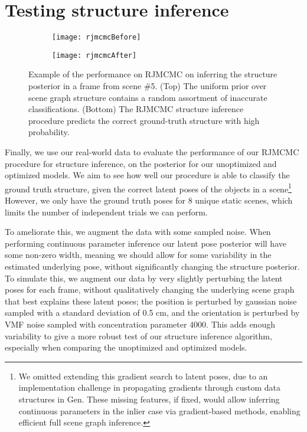 \raggedbottom
\pagebreak
\flushbottom

\section{Testing structure inference}
\begin{figure}[H]
  \begin{subfigure}[b]{\textwidth}
    \centering
    \texttt{[image: rjmcmcBefore]}
  \end{subfigure}
  \begin{subfigure}[b]{\textwidth}
    \centering
    \texttt{[image: rjmcmcAfter]}
  \end{subfigure}
  \caption{
    Example of the performance on RJMCMC on inferring the structure posterior in a frame from scene \#5.
    (Top) The uniform prior over scene graph structure contains a random assortment of inaccurate classifications.
    (Bottom) The RJMCMC structure inference procedure predicts the correct ground-truth structure with high probability.
  }
  \label{fig:rjmcmcExample}
\end{figure}
Finally, we use our real-world data to evaluate the performance of our RJMCMC procedure for structure inference, on the posterior for our unoptimized and optimized models.
We aim to see how well our procedure is able to classify the ground truth structure, given the correct latent poses of the objects in a scene\footnote{
  We omitted extending this gradient search to latent poses, due to an implementation challenge in propagating gradients through custom data structures in Gen.
  These missing features, if fixed, would allow inferring continuous parameters in the inlier case via gradient-based methods, enabling efficient full scene graph inference.
}
However, we only have the ground truth poses for 8 unique static scenes, which limits the number of independent trials we can perform.

To ameliorate this, we augment the data with some sampled noise.
When performing continuous parameter inference our latent pose posterior will have some non-zero width, meaning we should allow for some variability in the estimated underlying pose, without significantly changing the structure posterior.
To simulate this, we augment our data by very slightly perturbing the latent poses for each frame, without qualitatively changing the underlying scene graph that best explains these latent poses; the position is perturbed by gaussian noise sampled with a standard deviation of 0.5 cm, and the orientation is perturbed by VMF noise sampled with concentration parameter 4000.
This adds enough variability to give a more robust test of our structure inference algorithm, especially when comparing the unoptimized and optimized models.

